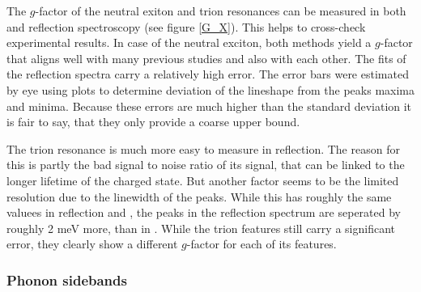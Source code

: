 The $g$-factor of the neutral exiton and trion resonances can be measured in both \pl and reflection spectroscopy (see figure \ref{G_X}). This helps to cross-check experimental results. In case of the neutral exciton, both methods yield a $g$-factor that aligns well with many previous studies and also with each other. The fits of the reflection spectra carry a relatively high error. The error bars were estimated by eye using plots to determine deviation of the lineshape from the peaks maxima and minima. Because these errors are much higher than the standard deviation it is fair to say, that they only provide a coarse upper bound.

The trion resonance is much more easy to measure in reflection. The reason for this is partly the bad signal to noise ratio of its \pl signal, that can be linked to the longer lifetime of the charged state\cite{hao_trion_2017}. But another factor seems to be the limited resolution due to the linewidth of the peaks. While this has roughly the same valuees in reflection and \pl, the peaks in the reflection spectrum are seperated by roughly 2 meV more, than in \pl. While the trion features still carry a significant error, they clearly show a different $g$-factor for each of its features.

\subsubsection{Phonon sidebands}

